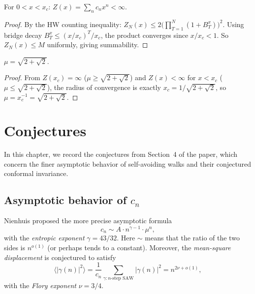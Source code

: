 \begin{lemma}
\begin{enumerate}
\begin{theorem}
\label{thm:Z-summable-proved}
  For $0 < x < x_c$: $Z(x) = \sum_n c_n x^n < \infty$.
\end{theorem}
\begin{proof}
  By the HW counting inequality:
  $Z_N(x) \leq 2\bigl(\prod_{T=1}^N (1 + B_T^x)\bigr)^2$.
  Using bridge decay $B_T^x \leq (x/x_c)^T/x_c$, the product converges
  since $x/x_c < 1$. So $Z_N(x) \leq M$ uniformly, giving summability.
\end{proof}

\begin{theorem}
\label{thm:main-proved}
  $\mu = \sqrt{2 + \sqrt{2}}$.
\end{theorem}
\begin{proof}
  From $Z(x_c) = \infty$ ($\mu \geq \sqrt{2{+}\sqrt{2}}$) and
  $Z(x) < \infty$ for $x < x_c$ ($\mu \leq \sqrt{2{+}\sqrt{2}}$),
  the radius of convergence is exactly $x_c = 1/\sqrt{2{+}\sqrt{2}}$,
  so $\mu = x_c^{-1} = \sqrt{2{+}\sqrt{2}}$.
\end{proof}


\chapter{Conjectures}\label{chap:conjectures}

In this chapter, we record the conjectures from Section~4 of the paper,
which concern the finer asymptotic behavior of self-avoiding walks and
their conjectured conformal invariance.

\section{Asymptotic behavior of $c_n$}

Nienhuis proposed the more precise asymptotic formula
\[
  c_n \sim A \cdot n^{\gamma - 1} \cdot \mu^n,
\]
with the \emph{entropic exponent} $\gamma = 43/32$. Here $\sim$ means
that the ratio of the two sides is $n^{o(1)}$ (or perhaps tends to a
constant). Moreover, the \emph{mean-square displacement} is conjectured
to satisfy
\[
  \langle |\gamma(n)|^2 \rangle
  = \frac{1}{c_n} \sum_{\gamma : n\text{-step SAW}} |\gamma(n)|^2
  = n^{2\nu + o(1)},
\]
with the \emph{Flory exponent} $\nu = 3/4$.


\end{enumerate}
\end{lemma}
